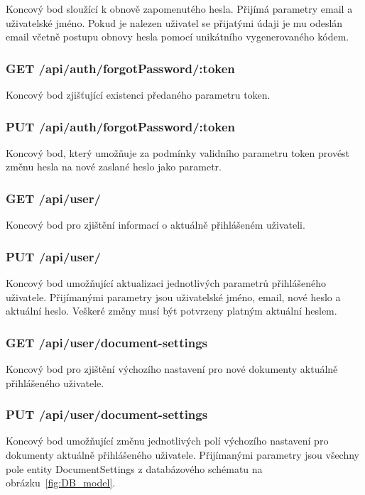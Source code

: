 Koncový bod sloužící k obnově zapomenutého hesla.
Přijímá parametry email a uživatelské jméno.
Pokud je nalezen uživatel se přijatými údaji je mu odeslán email včetně postupu obnovy hesla pomocí unikátního vygenerovaného kódem.

\subsubsection{GET /api/auth/forgotPassword/:token}

Koncový bod zjišťující existenci předaného parametru token.

\subsubsection{PUT /api/auth/forgotPassword/:token}

Koncový bod, který umožňuje za podmínky validního parametru token provést změnu hesla na nové zaslané heslo jako parametr.

\subsubsection{GET /api/user/}

Koncový bod pro zjištění informací o aktuálně přihlášeném uživateli.

\subsubsection{PUT /api/user/}

Koncový bod umožňující aktualizaci jednotlivých parametrů přihlášeného uživatele.
Přijímanými parametry jsou uživatelské jméno, email, nové heslo a aktuální heslo.
Veškeré změny musí být potvrzeny platným aktuální heslem.

\subsubsection{GET /api/user/document-settings}

Koncový bod pro zjištění výchozího nastavení pro nové dokumenty aktuálně přihlášeného uživatele.

\subsubsection{PUT /api/user/document-settings}

Koncový bod umožňující změnu jednotlivých polí výchozího nastavení pro dokumenty aktuálně přihlášeného uživatele.
Přijímanými parametry jsou všechny pole entity DocumentSettings z databázového schématu na obrázku~\ref{fig:DB_model}.

